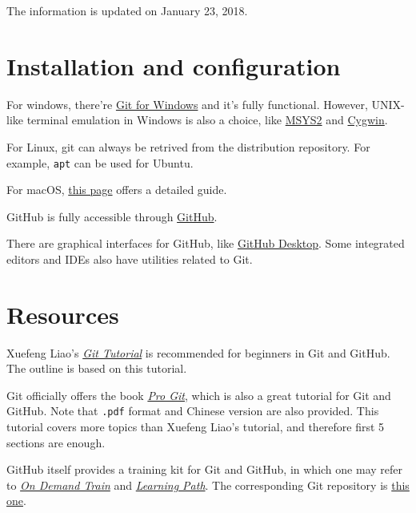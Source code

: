\documentclass[english]{../TeXTemplate/pkupaper}
\title{\titlemark}
\author{pppppass}
\date{Updated on January 23, 2018}
\begin{document}
\maketitle

The information is updated on January 23, 2018.

\section{Installation and configuration}

For windows, there're \href{https://git-for-windows.github.io/}{Git for Windows} and it's fully functional. However, UNIX-like terminal emulation in Windows is also a choice, like \href{http://www.msys2.org/}{MSYS2} and \href{https://www.cygwin.com/}{Cygwin}.

For Linux, git can always be retrived from the distribution repository. For example, \verb"apt" can be used for Ubuntu.

For macOS, \href{https://git-scm.com/book/en/v2/Getting-Started-Installing-Git}{this page} offers a detailed guide.

GitHub is fully accessible through \href{https://github.com/}{GitHub}.

There are graphical interfaces for GitHub, like \href{https://desktop.github.com/}{GitHub Desktop}. Some integrated editors and IDEs also have utilities related to Git.

\section{Resources}

Xuefeng Liao's \href{https://www.liaoxuefeng.com/wiki/0013739516305929606dd18361248578c67b8067c8c017b000/}{\emph{Git Tutorial}} is recommended for beginners in Git and GitHub. The outline is based on this tutorial.

Git officially offers the book \href{https://git-scm.com/book/en/v2}{\emph{Pro Git}}, which is also a great tutorial for Git and GitHub. Note that \verb".pdf" format and Chinese version are also provided. This tutorial covers more topics than Xuefeng Liao's tutorial, and therefore first 5 sections are enough.

GitHub itself provides a training kit for Git and GitHub, in which one may refer to \href{https://services.github.com/on-demand/}{\emph{On Demand Train}} and \href{https://services.github.com/on-demand/resources/learning-path/}{\emph{Learning Path}}. The corresponding Git repository is \href{https://github.com/github/training-kit}{this one}.
\end{document}
